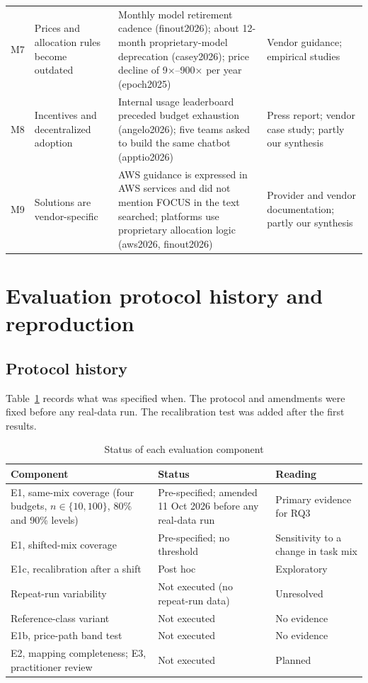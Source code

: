 \documentclass[10pt]{article}
\begin{document}
\begin{longtable}{p{0.8cm}p{3.6cm}p{6.4cm}p{3.2cm}}
M7 & Prices and allocation rules become outdated & Monthly model retirement cadence (finout2026); about 12-month proprietary-model deprecation (casey2026); price decline of 9$\times$--900$\times$ per year (epoch2025) & Vendor guidance; empirical studies \\
M8 & Incentives and decentralized adoption & Internal usage leaderboard preceded budget exhaustion (angelo2026); five teams asked to build the same chatbot (apptio2026) & Press report; vendor case study; partly our synthesis \\
M9 & Solutions are vendor-specific & AWS guidance is expressed in AWS services and did not mention FOCUS in the text searched; platforms use proprietary allocation logic (aws2026, finout2026) & Provider and vendor documentation; partly our synthesis \\
\bottomrule
\end{longtable}

\section{Evaluation protocol history and reproduction}
\subsection{Protocol history}
Table~\ref{tab:hist} records what was specified when. The protocol and amendments were fixed before any real-data run. The recalibration test was added after the first results.

\begin{table}[h]
\caption{Status of each evaluation component}\label{tab:hist}
\centering\small
\begin{tabular}{p{4.8cm}p{3.6cm}p{6.4cm}}
\toprule
Component & Status & Reading \\
\midrule
E1, same-mix coverage (four budgets, $n\in\{10,100\}$, 80\% and 90\% levels) & Pre-specified; amended 11 Oct 2026 before any real-data run & Primary evidence for RQ3 \\
E1, shifted-mix coverage & Pre-specified; no threshold & Sensitivity to a change in task mix \\
E1c, recalibration after a shift & Post hoc & Exploratory \\
Repeat-run variability & Not executed (no repeat-run data) & Unresolved \\
Reference-class variant & Not executed & No evidence \\
E1b, price-path band test & Not executed & No evidence \\
E2, mapping completeness; E3, practitioner review & Not executed & Planned \\
\bottomrule
\end{tabular}
\end{table}
\end{document}
